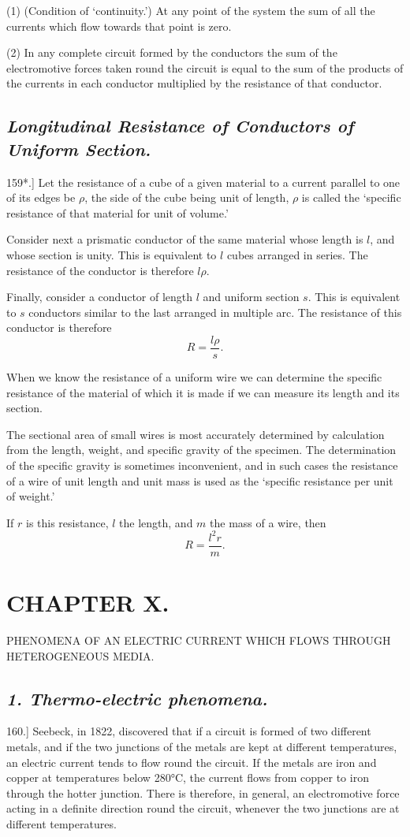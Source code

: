 \documentclass[12pt,oneside]{book}[2021/10/04]
\newcommand{\Heading}{\centering\normalfont}
\newcommand{\Chapter}[1]{\section*{\large\Heading #1}}
\newcommand{\Subsection}[1]{\subsection*{\normalsize\Heading\itshape #1}}
\newcommand{\Runhead}[1]{\fancyhead[C]{\iffloatpage{}{\small#1}}}
\newcommand{\Subheading}[1]{\begin{center}\small #1 \end{center}}
\newcommand{\article}[1]{\phantomsection \label{art:#1}{#1.]}}
\newcommand{\¬}{\hphantom{0}}
\newcommand{\newchapter}{\newpage\thispagestyle{empty}}
\begin{document}
(1) (Condition of `continuity.') At any point of the system the
sum of all the currents which flow towards that point is zero.

(2) In any complete circuit formed by the conductors the sum
of the electromotive forces taken round the circuit is equal to the
sum of the products of the currents in each conductor multiplied
by the resistance of that conductor.

\Subsection{Longitudinal Resistance of Conductors of Uniform Section.}

\article{159*} Let the resistance of a cube of a given material to a
current parallel to one of its edges be \(\rho\), the side of the cube being
unit of length, \(\rho\) is called the `specific resistance of that material
for unit of volume.'
\Runhead{RESISTANCE OF A WIRE.}

Consider next a prismatic conductor of the same material whose
length is \(l\), and whose section is unity. This is equivalent to \(l\)
cubes arranged in series. The resistance of the conductor is therefore
\(l \rho\).

Finally, consider a conductor of length \(l\) and uniform section \(s\).
This is equivalent to \(s\) conductors similar to the last arranged in
multiple arc. The resistance of this conductor is therefore
\[
R = \frac{l\rho}{s}\text{.}
\]

When we know the resistance of a uniform wire we can determine
the specific resistance of the material of which it is made if we can
measure its length and its section.

The sectional area of small wires is most accurately determined
by calculation from the length, weight, and specific gravity of the
specimen. The determination of the specific gravity is sometimes
inconvenient, and in such cases the resistance of a wire of unit
length and unit mass is used as the `specific resistance per unit of
weight.'

If \(r\) is this resistance, \(l\) the length, and \(m\) the mass of a wire, then
\[
R = \frac{l^2r}{m}\text{.}
\]

\newchapter
\Chapter{CHAPTER X.}

\Subheading{PHENOMENA OF AN ELECTRIC CURRENT WHICH FLOWS
THROUGH HETEROGENEOUS MEDIA.}

\Subsection{\textup{1}. Thermo-electric phenomena.}

\article{160} Seebeck, in 1822, discovered that if a circuit is formed of
two different metals, and if the two junctions of the metals are
kept at different temperatures, an electric current tends to flow
round the circuit. If the metals are iron and copper at temperatures
below 280°C, the current flows from copper to iron through
the hotter junction. There is therefore, in general, an electromotive
force acting in a definite direction round the circuit, whenever
the two junctions are at different temperatures.
\end{document}

